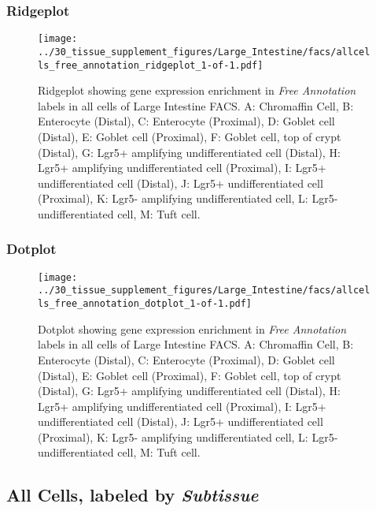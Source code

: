 \clearpage

\subsubsection{Ridgeplot}
\begin{figure}[h]
\centering
\texttt{[image: ../30\_tissue\_supplement\_figures/Large\_Intestine/facs/allcells\_free\_annotation\_ridgeplot\_1-of-1.pdf]}

\caption{ Ridgeplot  showing gene expression enrichment in \emph{Free Annotation} labels in all cells of Large Intestine FACS. A: Chromaffin Cell, B: Enterocyte (Distal), C: Enterocyte (Proximal), D: Goblet cell (Distal), E: Goblet cell (Proximal), F: Goblet cell, top of crypt (Distal), G: Lgr5+ amplifying undifferentiated cell (Distal), H: Lgr5+ amplifying undifferentiated cell (Proximal), I: Lgr5+ undifferentiated cell (Distal), J: Lgr5+ undifferentiated cell (Proximal), K: Lgr5- amplifying undifferentiated cell, L: Lgr5- undifferentiated cell, M: Tuft cell.}
\end{figure}


\clearpage

\subsubsection{Dotplot}
\begin{figure}[h]
\centering
\texttt{[image: ../30\_tissue\_supplement\_figures/Large\_Intestine/facs/allcells\_free\_annotation\_dotplot\_1-of-1.pdf]}

\caption{ Dotplot  showing gene expression enrichment in \emph{Free Annotation} labels in all cells of Large Intestine FACS. A: Chromaffin Cell, B: Enterocyte (Distal), C: Enterocyte (Proximal), D: Goblet cell (Distal), E: Goblet cell (Proximal), F: Goblet cell, top of crypt (Distal), G: Lgr5+ amplifying undifferentiated cell (Distal), H: Lgr5+ amplifying undifferentiated cell (Proximal), I: Lgr5+ undifferentiated cell (Distal), J: Lgr5+ undifferentiated cell (Proximal), K: Lgr5- amplifying undifferentiated cell, L: Lgr5- undifferentiated cell, M: Tuft cell.}
\end{figure}


\clearpage

\subsection{All Cells, labeled by \emph{Subtissue}}
